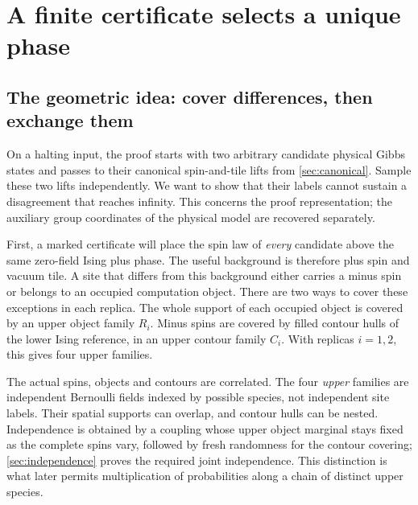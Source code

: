 \documentclass[11pt,reqno]{amsart}
\numberwithin{equation}{section}
\theoremstyle{definition}
\theoremstyle{remark}
\begin{document}
\section{A finite certificate selects a unique phase}\label{sec:selection}

\subsection{The geometric idea: cover differences, then exchange them}\label{sec:geometricidea}
On a halting input, the proof starts with two arbitrary candidate physical Gibbs states and passes to their canonical spin-and-tile lifts from \cref{sec:canonical}. Sample these two lifts independently. We want to show that their labels cannot sustain a disagreement that reaches infinity. This concerns the proof representation; the auxiliary group coordinates of the physical model are recovered separately.

First, a marked certificate will place the spin law of \emph{every} candidate above the same zero-field Ising plus phase. The useful background is therefore plus spin and vacuum tile. A site that differs from this background either carries a minus spin or belongs to an occupied computation object. There are two ways to cover these exceptions in each replica. The whole support of each occupied object is covered by an upper object family $R_i$. Minus spins are covered by filled contour hulls of the lower Ising reference, in an upper contour family $C_i$. With replicas $i=1,2$, this gives four upper families.

The actual spins, objects and contours are correlated. The four \emph{upper} families are independent Bernoulli fields indexed by possible species, not independent site labels. Their spatial supports can overlap, and contour hulls can be nested. Independence is obtained by a coupling whose upper object marginal stays fixed as the complete spins vary, followed by fresh randomness for the contour covering; \cref{sec:independence} proves the required joint independence. This distinction is what later permits multiplication of probabilities along a chain of distinct upper species.
\end{document}
